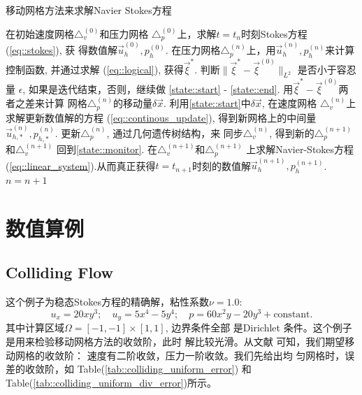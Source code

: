    \begin{algorithm}
     \caption{移动网格方法来求解Navier Stokes方程}
     \begin{algorithmic}[1]
       \State 在初始速度网格$\triangle_v^{(0)}$和压力网格
       $\triangle_p^{(0)}$上，求解$t = t_n$时刻Stokes方程(\ref{eq::stokes}), 获
       得数值解$\vec{u}_h^{(0)}, p_h^{(0)}$.
             \State 在压力网格$\triangle_p^{(n)}$上，用$\vec{u}_h^{(n)},
                    p_h^{(n)}$来计算控制函数, 并通过求解
                    (\ref{eq::logical}), 获得$\vec{\xi}^*$. \label{state::monitor}
             \State 判断$\parallel \vec{\xi}^* -
                    \vec{\xi}^{(0)} \parallel_{L^2}$ 是否小于容忍量
                    $\epsilon$, 如果是迭代结束，否则，继续做
                    \ref{state::start} - \ref{state::end}.
             \State 用$\vec{\xi}^* - \vec{\xi}^{(0)}$两者之差来计算
                    网格$\triangle_p^{(n)}$的移动量$\delta \vec{x}$.
                    \label{state::start}
             \State 利用\ref{state::start}中$\delta \vec{x}$, 在速度网格
                    $\triangle_v^{(n)}$上求解更新数值解的方程
                    (\ref{eq::continous_update}), 得到新网格上的中间量
                    $\vec{u}_{h, *}^{(n)}, p_{h, *}^{(n)}$.
             \State 更新$\triangle_p^{(n)}$, 通过几何遗传树结构，来
                    同步$\triangle_v^{(n)}$, 得到新的$\triangle_p^{(n
                    + 1)}$和$\triangle_v^{(n + 1)}$
             \State 回到\ref{state::monitor}. \label{state::end}
             \State 在$\triangle_v^{(n + 1)}$和$\triangle_p^{(n + 1)}$
                    上求解Navier-Stokes方程
                    (\ref{eq::linear_system}).从而真正获得$t = t_{n +
                      1}$时刻的数值解$\vec{u}_h^{(n + 1)}, p_h^{(n +
                      1)}$.
             \State $n = n + 1$
        \EndWhile
     \end{algorithmic}
     \label{alg::solve}
   \end{algorithm}

    \section{数值算例}
       \subsection{Colliding Flow}
          这个例子为稳态Stokes方程的精确解，粘性系数$\nu = 1.0$:
          \begin{equation}
            u_x = 20 x y^3; \quad u_y = 5 x^4 - 5 y^4; \quad p = 60 x^2 y - 20
            y^3 + \mbox{constant}.
            \label{eq::colliding}
          \end{equation}
          其中计算区域$\Omega = [-1, -1] \times [1, 1]$, 边界条件全部
          是Dirichlet 条件。这个例子是用来检验移动网格方法的收敛阶，此时
          解比较光滑。从文献\cite{bercovier1979error} 可知，我们期望移
          动网格的收敛阶： 速度有二阶收敛，压力一阶收敛。我们先给出均
          匀网格时，误差的收敛阶，如
          Table(\ref{tab::colliding_uniform_error}) 和
          Table(\ref{tab::colliding_uniform_div_error})所示。

